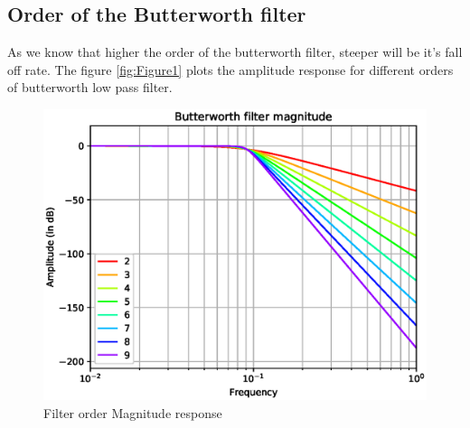 \documentclass[journal,12pt,twocolumn]{IEEEtran}
\begin{document}
  \subsection{\textbf{Order of the Butterworth filter}}
  As we know that higher the order of the butterworth filter, steeper will be it's fall off rate. The figure \ref{fig:Figure1} plots the amplitude response for different orders of butterworth low pass filter. 

\begin{figure}[!h]
\centering
\includegraphics[width=1.2\columnwidth]{./figs/ee18btech11051_1.eps}
\caption{Filter order Magnitude response}
\label{fig:Figure0}
\end{figure}
\end{document}
